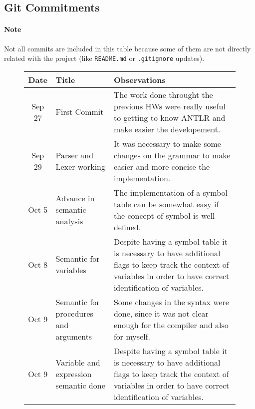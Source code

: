 \newpage

\subsection{Git Commitments}
\paragraph{Note} Not all commits are included in this table because some of
them are not directly related with the project (like \texttt{README.md} or
\texttt{.gitignore} updates).

\begin{figure}[h]
    \centering
    \begin{tabular}{cp{1.25in}p{2.5in}}
        \toprule
        \textbf{Date} & \textbf{Title} & \textbf{Observations}\\
        \midrule
        Sep 27 & First Commit &
        The work done throught the previous HWs were really useful to getting
        to know ANTLR and make easier the \newline developement.\\

        \midrule
        Sep 29 & Parser and Lexer working &
        It was necessary to make some changes on the grammar to make easier
        and more concise the implementation.\\

        \midrule
        Oct  5 & Advance in semantic analysis &
        The implementation of a symbol table can be somewhat easy if the
        concept of symbol is well defined.\\

        \midrule
        Oct  8 & Semantic for \newline variables &
        Despite having a symbol table it is necessary to have additional
        flags to keep track the context of variables in order to have
        correct identification of variables.\\

        \midrule
        Oct  9 & Semantic for \newline procedures and \newline arguments &
        Some changes in the syntax were done, since it was not clear enough for 
        the compiler and also for myself.\\

        \midrule
        Oct  9 & Variable and \newline expression semantic done &
        Despite having a symbol table it is necessary to have additional
        flags to keep track the context of variables in order to have
        correct identification of variables.\\


\end{tabular}
\end{figure}
